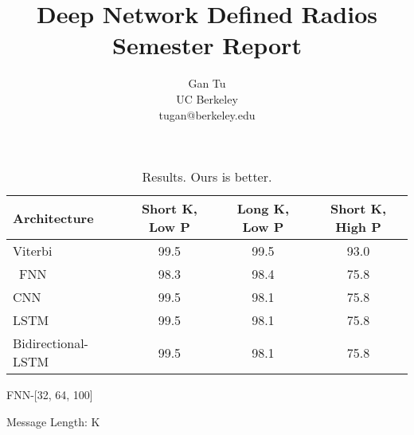 \documentclass[10pt,twocolumn,letterpaper]{article}
\begin{document}
\title{Deep Network Defined Radios Semester Report}

\author{Gan Tu\\
UC Berkeley\\
tugan@berkeley.edu
}

\maketitle

\begin{table}
\begin{center}
\begin{tabular}{|l|c|c|c|}
\hline
Architecture & Short K, Low P & Long K, Low P & Short K, High P \\
\hline\hline
   Viterbi & 99.5 & 99.5 & 93.0 \\\
   FNN & 98.3 & 98.4 & 75.8 \\
   CNN & 99.5 & 98.1 & 75.8 \\
   LSTM & 99.5 & 98.1 & 75.8 \\
   Bidirectional-LSTM & 99.5 & 98.1 & 75.8 \\
\hline
\end{tabular}
\end{center}
\caption{Results.   Ours is better.}
\end{table}

FNN-[32, 64, 100]

Message Length: K
\end{document}
